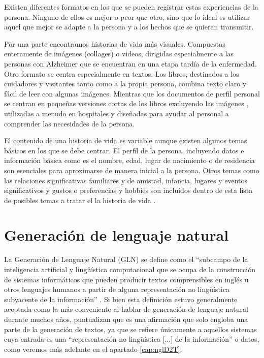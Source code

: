 Existen diferentes formatos en los que se pueden registrar estas experiencias de la persona. Ninguno de ellos es mejor o peor que otro, sino que lo ideal es utilizar aquel que mejor se adapte a la persona y a los hechos que se quieran transmitir.

Por una parte encontramos historias de vida más visuales. Compuestas enteramente de imágenes (collages) o videos, dirigidas especialmente a las personas con Alzheimer que se encuentran en una etapa tardía de la enfermedad. Otro formato se centra especialmente en textos. Los libros, destinados a los cuidadores y visitantes tanto como a la propia persona, combina texto claro y fácil de leer con algunas imágenes. Mientras que los documentos de perfil personal se centran en pequeñas versiones cortas de los libros excluyendo las imágenes , utilizadas a menudo en hospitales y diseñadas para ayudar al personal a comprender las necesidades de la persona.

El contenido de una historia de vida es variable aunque existen algunos temas básicos en los que se debe centrar. El perfil de la persona, incluyendo datos e información básica como es el nombre, edad, lugar de nacimiento o de residencia son esenciales para aproximarse de manera inicial a la persona. Otros temas como las relaciones significativas familiares y de amistad, infancia, lugares y eventos significativos y gustos o preferencias y hobbies son incluidos dentro de esta lista de posibles temas a tratar el la historia de vida \citep{dementiauk}.

\section{Generación de lenguaje natural}

La Generación de Lenguaje Natural (GLN) se define como el ``subcampo de la inteligencia artificial y lingüística computacional que se ocupa de la construcción de sistemas informáticos que pueden producir textos comprensibles en inglés u otros lenguajes humanos a partir de alguna representación no lingüística subyacente de la información''  \citep{reiter1997building}. Si bien esta definición estuvo generalmente aceptada como la más conveniente al hablar de generación de lenguaje natural durante muchos años, \cite{gatt2018survey} puntualizan que es una afirmación que solo engloba una parte de la generación de textos, ya que se refiere únicamente a aquellos sistemas cuya entrada es una ``representación no lingüística [...] de la información'' o datos, como veremos más adelante en el apartado \ref{cap:nglD2T}.

